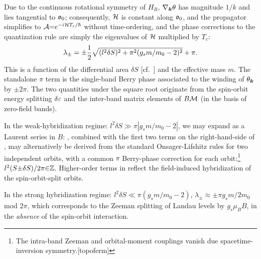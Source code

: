 \documentclass[aps, prb, showpacs, twocolumn, notitlepage, superscriptaddress]{revtex4-1}
\begin{document}
Due to the continuous rotational symmetry of $H_R$, $\nabla_{\boldsymbol{k}} \theta$ has magnitude $1/k$ and lies tangential to $\mathfrak{o}_0$; consequently, ${\cal H}$ is constant along $\mathfrak{o}_0$, and the propagator simplifies to ${\cal A}{=}e^{{-}i{\cal H} T_c/\hbar}$ without time-ordering, and the phase corrections to the quantization rule are simply the eigenvalues of ${\cal H}$ multiplied by $T_c$:
\begin{equation}
\lambda_{\pm}=\pm\frac{1}{2}\sqrt{({l^2\delta S})^2+\pi^2(g_sm/m_0-2)^2}+\pi. \label{eq:Rashba-lambda}
\end{equation}
This is a function of the differential area $\delta S$ [cf.\ ] and the effective mass $m$. The standalone $\pi$ term is the single-band Berry phase associated to the winding of $\theta_{\boldsymbol{k}}$ by ${\pm}2\pi$. The two quantities under the square root originate from the spin-orbit energy splitting $\delta \varepsilon$ and the inter-band matrix elements of $B{\cal M}$ (in the basis of zero-field bands). 

In the weak-hybridization regime: $l^2\delta S  \gg \pi|g_s m/m_0{-}2|$, we may expand  as a Laurent series in $B$:
, combined with the first two terms on the right-hand-side of , may alternatively be derived from 
the standard Onsager-Lifshitz rules for two independent orbits, with a common $\pi$ Berry-phase correction for each orbit:\footnote{The intra-band Zeeman and orbital-moment couplings vanish due spacetime-inversion symmetry.[topoferm]} $l^2(S{\pm}\delta S)/2\pi {\in}\mathbb{Z}$. Higher-order terms in  reflect the field-induced hybridization of the spin-orbit-split orbits. 


In the strong hybridization regime: $l^2\delta S {\ll}\pi(g_sm/m_0{-}2)$, $\lambda_{\pm}{\approx}{\pm}\pi g_sm/2m_0$ mod $2\pi$, which corresponds to the Zeeman splitting of Landau levels by $g_{s}\mu_BB$, in the \textit{absence} of the spin-orbit interaction. 



\end{document}
